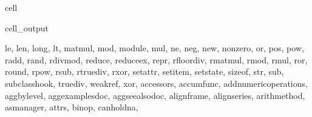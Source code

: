 \documentclass[letterpaper,10pt,english]{jupyterBook}
\begin{document}
\begin{sphinxuseclass}{cell}
\begin{sphinxVerbatimOutput}
\begin{sphinxuseclass}{cell_output}
\begin{sphinxVerbatim}[commandchars=\\\{\}]
\PYGZsq{}\PYGZus{}\PYGZus{}le\PYGZus{}\PYGZus{}\PYGZsq{}, \PYGZsq{}\PYGZus{}\PYGZus{}len\PYGZus{}\PYGZus{}\PYGZsq{}, \PYGZsq{}\PYGZus{}\PYGZus{}long\PYGZus{}\PYGZus{}\PYGZsq{}, \PYGZsq{}\PYGZus{}\PYGZus{}lt\PYGZus{}\PYGZus{}\PYGZsq{}, \PYGZsq{}\PYGZus{}\PYGZus{}matmul\PYGZus{}\PYGZus{}\PYGZsq{}, \PYGZsq{}\PYGZus{}\PYGZus{}mod\PYGZus{}\PYGZus{}\PYGZsq{}, \PYGZsq{}\PYGZus{}\PYGZus{}module\PYGZus{}\PYGZus{}\PYGZsq{}, \PYGZsq{}\PYGZus{}\PYGZus{}mul\PYGZus{}\PYGZus{}\PYGZsq{}, \PYGZsq{}\PYGZus{}\PYGZus{}ne\PYGZus{}\PYGZus{}\PYGZsq{}, \PYGZsq{}\PYGZus{}\PYGZus{}neg\PYGZus{}\PYGZus{}\PYGZsq{}, \PYGZsq{}\PYGZus{}\PYGZus{}new\PYGZus{}\PYGZus{}\PYGZsq{}, \PYGZsq{}\PYGZus{}\PYGZus{}nonzero\PYGZus{}\PYGZus{}\PYGZsq{}, \PYGZsq{}\PYGZus{}\PYGZus{}or\PYGZus{}\PYGZus{}\PYGZsq{}, \PYGZsq{}\PYGZus{}\PYGZus{}pos\PYGZus{}\PYGZus{}\PYGZsq{}, \PYGZsq{}\PYGZus{}\PYGZus{}pow\PYGZus{}\PYGZus{}\PYGZsq{}, \PYGZsq{}\PYGZus{}\PYGZus{}radd\PYGZus{}\PYGZus{}\PYGZsq{}, \PYGZsq{}\PYGZus{}\PYGZus{}rand\PYGZus{}\PYGZus{}\PYGZsq{}, \PYGZsq{}\PYGZus{}\PYGZus{}rdivmod\PYGZus{}\PYGZus{}\PYGZsq{}, \PYGZsq{}\PYGZus{}\PYGZus{}reduce\PYGZus{}\PYGZus{}\PYGZsq{}, \PYGZsq{}\PYGZus{}\PYGZus{}reduce\PYGZus{}ex\PYGZus{}\PYGZus{}\PYGZsq{}, \PYGZsq{}\PYGZus{}\PYGZus{}repr\PYGZus{}\PYGZus{}\PYGZsq{}, \PYGZsq{}\PYGZus{}\PYGZus{}rfloordiv\PYGZus{}\PYGZus{}\PYGZsq{}, \PYGZsq{}\PYGZus{}\PYGZus{}rmatmul\PYGZus{}\PYGZus{}\PYGZsq{}, \PYGZsq{}\PYGZus{}\PYGZus{}rmod\PYGZus{}\PYGZus{}\PYGZsq{}, \PYGZsq{}\PYGZus{}\PYGZus{}rmul\PYGZus{}\PYGZus{}\PYGZsq{}, \PYGZsq{}\PYGZus{}\PYGZus{}ror\PYGZus{}\PYGZus{}\PYGZsq{}, \PYGZsq{}\PYGZus{}\PYGZus{}round\PYGZus{}\PYGZus{}\PYGZsq{}, \PYGZsq{}\PYGZus{}\PYGZus{}rpow\PYGZus{}\PYGZus{}\PYGZsq{}, \PYGZsq{}\PYGZus{}\PYGZus{}rsub\PYGZus{}\PYGZus{}\PYGZsq{}, \PYGZsq{}\PYGZus{}\PYGZus{}rtruediv\PYGZus{}\PYGZus{}\PYGZsq{}, \PYGZsq{}\PYGZus{}\PYGZus{}rxor\PYGZus{}\PYGZus{}\PYGZsq{}, \PYGZsq{}\PYGZus{}\PYGZus{}setattr\PYGZus{}\PYGZus{}\PYGZsq{}, \PYGZsq{}\PYGZus{}\PYGZus{}setitem\PYGZus{}\PYGZus{}\PYGZsq{}, \PYGZsq{}\PYGZus{}\PYGZus{}setstate\PYGZus{}\PYGZus{}\PYGZsq{}, \PYGZsq{}\PYGZus{}\PYGZus{}sizeof\PYGZus{}\PYGZus{}\PYGZsq{}, \PYGZsq{}\PYGZus{}\PYGZus{}str\PYGZus{}\PYGZus{}\PYGZsq{}, \PYGZsq{}\PYGZus{}\PYGZus{}sub\PYGZus{}\PYGZus{}\PYGZsq{}, \PYGZsq{}\PYGZus{}\PYGZus{}subclasshook\PYGZus{}\PYGZus{}\PYGZsq{}, \PYGZsq{}\PYGZus{}\PYGZus{}truediv\PYGZus{}\PYGZus{}\PYGZsq{}, \PYGZsq{}\PYGZus{}\PYGZus{}weakref\PYGZus{}\PYGZus{}\PYGZsq{}, \PYGZsq{}\PYGZus{}\PYGZus{}xor\PYGZus{}\PYGZus{}\PYGZsq{}, \PYGZsq{}\PYGZus{}accessors\PYGZsq{}, \PYGZsq{}\PYGZus{}accum\PYGZus{}func\PYGZsq{}, \PYGZsq{}\PYGZus{}add\PYGZus{}numeric\PYGZus{}operations\PYGZsq{}, \PYGZsq{}\PYGZus{}agg\PYGZus{}by\PYGZus{}level\PYGZsq{}, \PYGZsq{}\PYGZus{}agg\PYGZus{}examples\PYGZus{}doc\PYGZsq{}, \PYGZsq{}\PYGZus{}agg\PYGZus{}see\PYGZus{}also\PYGZus{}doc\PYGZsq{}, \PYGZsq{}\PYGZus{}align\PYGZus{}frame\PYGZsq{}, \PYGZsq{}\PYGZus{}align\PYGZus{}series\PYGZsq{}, \PYGZsq{}\PYGZus{}arith\PYGZus{}method\PYGZsq{}, \PYGZsq{}\PYGZus{}as\PYGZus{}manager\PYGZsq{}, \PYGZsq{}\PYGZus{}attrs\PYGZsq{}, \PYGZsq{}\PYGZus{}binop\PYGZsq{}, \PYGZsq{}\PYGZus{}can\PYGZus{}hold\PYGZus{}na\PYGZsq{}, 
\end{sphinxVerbatim}
\end{sphinxuseclass}
\end{sphinxVerbatimOutput}
\end{sphinxuseclass}
\end{document}
